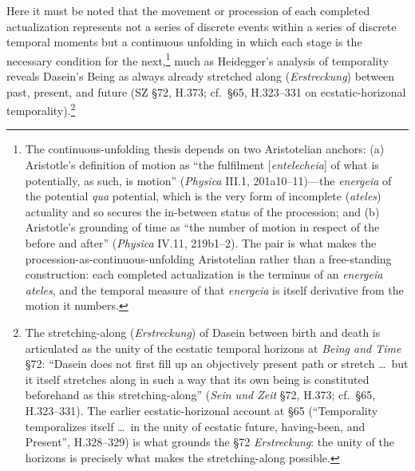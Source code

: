\documentclass{article}
\begin{document}
Here it must be noted that the movement or procession of each completed actualization represents not a series of discrete events within a series of discrete temporal moments but a continuous unfolding in which each stage is the necessary condition for the next,\footnote{The continuous-unfolding thesis depends on two Aristotelian anchors: (a) Aristotle's definition of motion as ``the fulfilment [\textit{entelecheia}] of what is potentially, as such, is motion'' (\textit{Physica} III.1, 201a10--11)---the \textit{energeia} of the potential \textit{qua} potential, which is the very form of incomplete (\textit{ateles}) actuality and so secures the in-between status of the procession; and (b) Aristotle's grounding of time as ``the number of motion in respect of the before and after'' (\textit{Physica} IV.11, 219b1--2). The pair is what makes the procession-as-continuous-unfolding Aristotelian rather than a free-standing construction: each completed actualization is the terminus of an \textit{energeia ateles}, and the temporal measure of that \textit{energeia} is itself derivative from the motion it numbers.} much as Heidegger's analysis of temporality reveals Dasein's Being as always already stretched along (\textit{Erstreckung}) between past, present, and future (SZ §72, H.373; cf.~§65, H.323--331 on ecstatic-horizonal temporality).\footnote{The stretching-along (\textit{Erstreckung}) of Dasein between birth and death is articulated as the unity of the ecstatic temporal horizons at \textit{Being and Time} §72: ``Dasein does not first fill up an objectively present path or stretch \ldots\ but it itself stretches along in such a way that its own being is constituted beforehand as this stretching-along'' (\textit{Sein und Zeit} §72, H.373; cf.~§65, H.323--331). The earlier ecstatic-horizonal account at §65 (``Temporality temporalizes itself \ldots\ in the unity of ecstatic future, having-been, and Present'', H.328--329) is what grounds the §72 \textit{Erstreckung}: the unity of the horizons is precisely what makes the stretching-along possible.}
\end{document}
